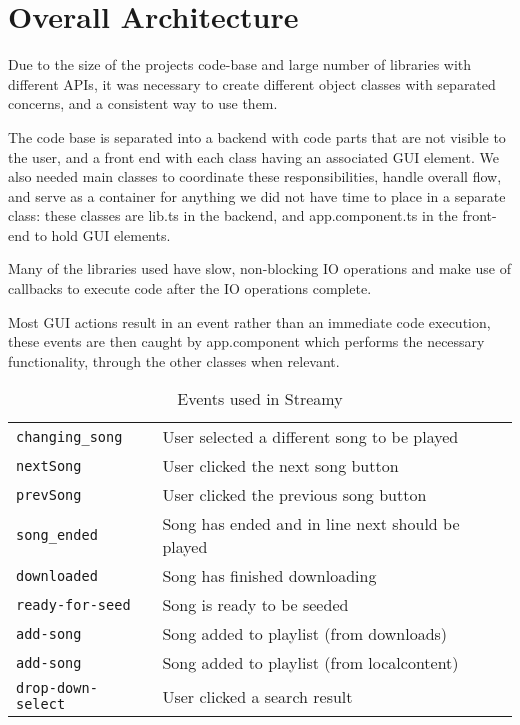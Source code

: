 \section{Overall Architecture}
Due to the size of the projects code-base and large number of libraries with different \acs{API}s, 
it was necessary to create different object classes with separated concerns,
and a consistent way to use them.

The code base is separated into a backend with code parts that are not visible to the user,
and a front end with each class having an associated \acs{GUI} element.
We also needed main classes to coordinate these responsibilities, handle overall flow,
and serve as a container for anything we did not have time to place in a separate class:
these classes are lib.ts in the backend,
and app.component.ts in the front-end to hold \acs{GUI} elements.

Many of the libraries used have slow, non-blocking IO operations
and make use of callbacks to execute code after the IO operations complete.

Most \acs{GUI} actions result in an event rather than an immediate code execution, 
these events are then caught by app.component
which performs the necessary functionality, through the other classes when relevant.

\begin{table}[h]
	\centering
	\begin{tabular}{l | l}
	    \verb|changing_song|    & User selected a different song to be played \\
		\verb|nextSong|         & User clicked the next song button \\
		\verb|prevSong|         & User clicked the previous song button \\
		\verb|song_ended|       & Song has ended and in line next should be played \\
		\verb|downloaded|       & Song has finished downloading \\
		\verb|ready-for-seed|   & Song is ready to be seeded \\
		\verb|add-song|         & Song added to playlist (from downloads) \\
		\verb|add-song|         & Song added to playlist (from localcontent) \\
		\verb|drop-down-select| & User clicked a search result \\
	\end{tabular}
	\caption{Events used in Streamy}
	\label{table:events}
\end{table}

